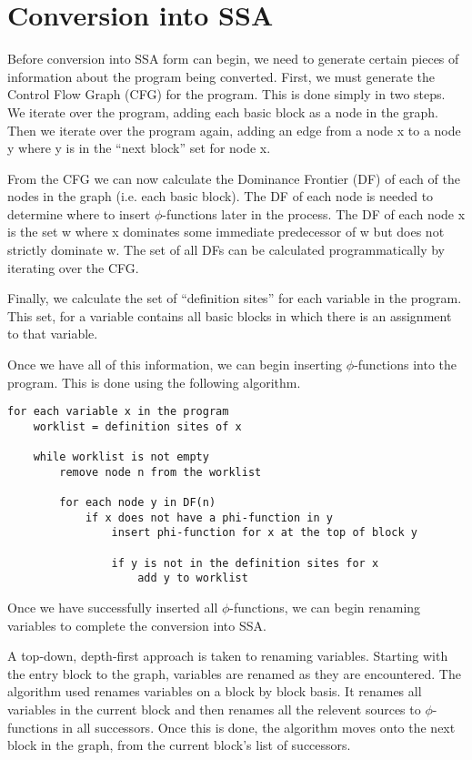 \documentclass[a4paper,10pt]{report}
\begin{document}
\section{Conversion into SSA}
Before conversion into SSA form can begin, we need to generate certain pieces of information about the program being converted.
First, we must generate the Control Flow Graph (CFG) for the program. This is done simply in two steps. We iterate over
the program, adding each basic block as a node in the graph. Then we iterate over the program again, adding an edge from a node
x to a node y where y is in the ``next block'' set for node x.

From the CFG we can now calculate the Dominance Frontier (DF) of each of the nodes in the graph (i.e. each basic block).
The DF of each node is needed to determine where to insert \(\phi\)-functions later in the process. The DF of each node x is 
the set {w} where x dominates some immediate predecessor of w but does not strictly dominate w. The set of all DFs can be 
calculated programmatically by iterating over the CFG.

Finally, we calculate the set of ``definition sites'' for each variable in the program. This set, for a variable contains 
all basic blocks in which there is an assignment to that variable.

Once we have all of this information, we can begin inserting \(\phi\)-functions into the program. This is done using the
following algorithm.

\begin{verbatim}
for each variable x in the program
    worklist = definition sites of x

    while worklist is not empty
        remove node n from the worklist

        for each node y in DF(n)
            if x does not have a phi-function in y
                insert phi-function for x at the top of block y

                if y is not in the definition sites for x
                    add y to worklist
\end{verbatim}

Once we have successfully inserted all \(\phi\)-functions, we can begin renaming variables to complete the conversion into
SSA. 

A top-down, depth-first approach is taken to renaming variables. Starting with the entry block to the graph, variables are renamed as they
are encountered. The algorithm used renames variables on a block by block basis. It renames all variables in the current block
and then renames all the relevent sources to \(\phi\)-functions in all successors. Once this is done, the algorithm moves onto
the next block in the graph, from the current block's list of successors.
\end{document}
